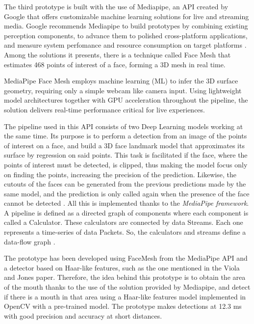 The third prototype is built with the use of Mediapipe, an API created by Google that offers customizable machine learning solutions for live and streaming media.
Google recommends Mediapipe to build prototypes by combining existing perception components, to advance them to polished cross-platform applications, and measure system perfomance and resource consumption on target platforms \cite{mediapipe}. Among the solutions it presents, there is a technique called Face Mesh that estimates 468 points of interest of a face, forming a 3D mesh in real time.

MediaPipe Face Mesh employs machine learning (ML) to infer the 3D surface geometry, requiring only a simple webcam like camera input. Using lightweight model architectures together with GPU acceleration throughout the pipeline, the solution delivers real-time performance critical for live experiences.

The pipeline used in this API consists of two Deep Learning models working at the same time. Its purpose is to perform a detection from an image of the points of interest on a face, and build a 3D face landmark model that approximates its surface by regression on said points. This task is facilitated if the face, where the points of interest must be detected, is clipped, thus making the model focus only on finding the points, increasing the precision of the prediction. Likewise, the cutouts of the faces can be generated from the previous predictions made by the same model, and the prediction is only called again when the presence of the face cannot be detected \cite{faceMesh}. All this is implemented thanks to the \textit{MediaPipe framework}. A pipeline is defined as a directed graph of components where each component is called a Calculator. These calculators are connected by data Streams. Each one represents a time-series of data Packets. So, the calculators and streams define a data-flow graph \cite{mediapipe}.

The prototype has been developed using FaceMesh from the MediaPipe API and a detector based on Haar-like features, such as the one mentioned in the Viola and Jones paper. Therefore, the idea behind this prototype is to obtain the area of the mouth thanks to the use of the solution provided by Mediapipe, and detect if there is a mouth in that area using a Haar-like features model implemented in OpenCV with a pre-trained model. The prototype makes detections at 12.3 ms with good precision and accuracy at short distances. 

